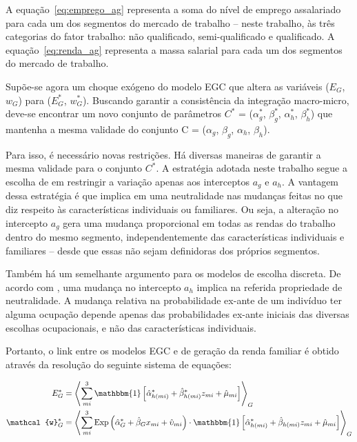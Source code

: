A equação~\eqref{eq:emprego_ag} representa a soma do nível de emprego assalariado para cada um dos segmentos do mercado de trabalho -- neste trabalho, às três categorias do fator trabalho: não qualificado, semi-qualificado e qualificado. A equação~\eqref{eq:renda_ag} representa a massa salarial para cada um dos segmentos do mercado de trabalho.

Supõe-se agora um choque exógeno do modelo EGC que altera as variáveis ($E_G$, $w_G$) para ($E_G^*$, $w_G^*$). Buscando garantir a consistência da integração macro-micro, deve-se encontrar um novo conjunto de parâmetros $C^*$ = ($\alpha_g^*$, $\beta_g^*$, $\alpha_h^*$, $\beta_h^*$) que mantenha a mesma validade do conjunto C = ($\alpha_g$, $\beta_g$, $\alpha_h$, $\beta_h$). 

Para isso, é necessário novas restrições. Há diversas maneiras de garantir a mesma validade para o conjunto $C^*$. A estratégia adotada neste trabalho segue a escolha de \textcite{bourguignon05} em restringir a variação apenas aos interceptos $a_g$ e $a_h$. A vantagem dessa estratégia é que implica em uma neutralidade nas mudanças feitas no que diz respeito às características individuais ou familiares. Ou seja, a alteração no intercepto $a_g$ gera uma mudança proporcional em todas as rendas do trabalho dentro do mesmo segmento, independentemente das características individuais e familiares -- desde que essas não sejam definidoras dos próprios segmentos.

Também há um semelhante argumento para os modelos de escolha discreta. De acordo com \textcite{bourguignon05}, uma mudança no intercepto $a_h$ implica na referida propriedade de neutralidade. A mudança relativa na probabilidade ex-ante de um indivíduo ter alguma ocupação depende apenas das probabilidades ex-ante iniciais das diversas escolhas ocupacionais, e não das características individuais.

Portanto, o link entre os modelos EGC e de geração da renda familiar é obtido através da resolução do seguinte sistema de equações:

\begin{align}
	E_G^* &= \left\langle \sum_{mi}^{3} \mathbbm{1} \left[ \hat{\alpha}_{h(mi)}^* + \hat{\beta}_{h(mi)}^* z_{mi} + \hat{\mu}_{mi} \right] \right\rangle_{G} \label{eq:emprego_ag*} \\
	\mathcal{w}_G^* &= \left\langle \sum_{mi}^{3} \text{Exp} \left( \hat{\alpha}_G^* + \hat{\beta}_G x_{mi} + \hat{\upsilon}_{mi} \right) \cdot \mathbbm{1} \left[ \hat{\alpha}_{h(mi)}^* + \hat{\beta}_{h(mi)} z_{mi} + \hat{\mu}_{mi} \right] \right\rangle_{G} \label{eq:renda_ag}
\end{align}

